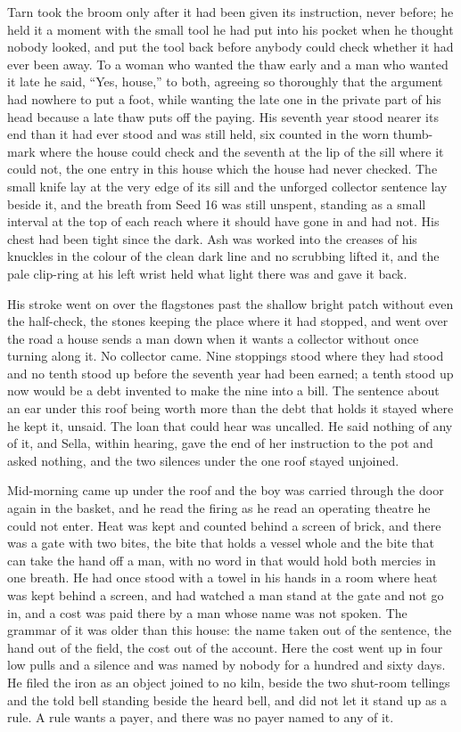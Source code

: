\scenebreak

Tarn took the broom only after it had been given its instruction, never before; he held it a moment with the small tool he had put into his pocket when he thought nobody looked, and put the tool back before anybody could check whether it had ever been away. To a woman who wanted the thaw early and a man who wanted it late he said, “Yes, house,” to both, agreeing so thoroughly that the argument had nowhere to put a foot, while wanting the late one in the private part of his head because a late thaw puts off the paying. His seventh year stood nearer its end than it had ever stood and was still held, six counted in the worn thumb-mark where the house could check and the seventh at the lip of the sill where it could not, the one entry in this house which the house had never checked. The small knife lay at the very edge of its sill and the unforged collector sentence lay beside it, and the breath from Seed 16 was still unspent, standing as a small interval at the top of each reach where it should have gone in and had not. His chest had been tight since the dark. Ash was worked into the creases of his knuckles in the colour of the clean dark line and no scrubbing lifted it, and the pale clip-ring at his left wrist held what light there was and gave it back.

His stroke went on over the flagstones past the shallow bright patch without even the half-check, the stones keeping the place where it had stopped, and went over the road a house sends a man down when it wants a collector without once turning along it. No collector came. Nine stoppings stood where they had stood and no tenth stood up before the seventh year had been earned; a tenth stood up now would be a debt invented to make the nine into a bill. The sentence about an ear under this roof being worth more than the debt that holds it stayed where he kept it, unsaid. The loan that could hear was uncalled. He said nothing of any of it, and Sella, within hearing, gave the end of her instruction to the pot and asked nothing, and the two silences under the one roof stayed unjoined.

\scenebreak

Mid-morning came up under the roof and the boy was carried through the door again in the basket, and he read the firing as he read an operating theatre he could not enter. Heat was kept and counted behind a screen of brick, and there was a gate with two bites, the bite that holds a vessel whole and the bite that can take the hand off a man, with no word in  that would hold both mercies in one breath. He had once stood with a towel in his hands in a room where heat was kept behind a screen, and had watched a man stand at the gate and not go in, and a cost was paid there by a man whose name was not spoken. The grammar of it was older than this house: the name taken out of the sentence, the hand out of the field, the cost out of the account. Here the cost went up in four low pulls and a silence and was named by nobody for a hundred and sixty days. He filed the iron as an object joined to no kiln, beside the two shut-room tellings and the told bell standing beside the heard bell, and did not let it stand up as a rule. A rule wants a payer, and there was no payer named to any of it.

